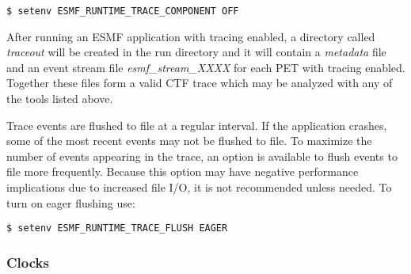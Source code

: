 \begin{verbatim}
$ setenv ESMF_RUNTIME_TRACE_COMPONENT OFF
\end{verbatim}

After running an ESMF application with tracing enabled, a directory
called {\em traceout} will be created in the run directory and it will
contain a {\em metadata} file and an event stream file {\em esmf\_stream\_XXXX}
for each PET with tracing enabled. Together these files form a valid
CTF trace which may be analyzed with any of the tools listed above.

Trace events are flushed to file at a regular interval. If the application
crashes, some of the most recent events may not be flushed to file. To
maximize the number of events appearing in the trace, an option is available
to flush events to file more frequently. Because this option may have
negative performance implications due to increased file I/O, it is not
recommended unless needed. To turn on eager flushing use:

\begin{verbatim}
$ setenv ESMF_RUNTIME_TRACE_FLUSH EAGER
\end{verbatim}

\subsubsection{Clocks}
\label{sec:TracingClocks}

